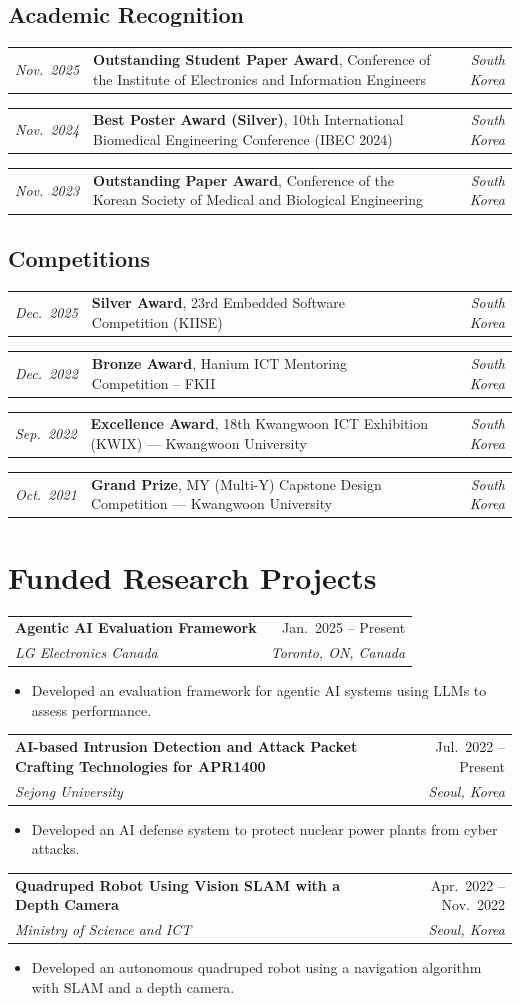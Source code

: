 \documentclass[11pt,letterpaper]{article}
\makeatletter
\newcommand{\entry}[4]{%
  \vspace{0.35em}\par
  \noindent\begin{tabularx}{\linewidth}{@{}X r@{}}
    \textbf{#1} & #2 \\[0.05em]
    \textit{#3} & \textit{#4}
  \end{tabularx}\par\vspace{0.1em}
}
\newcommand{\honor}[3]{%
  \noindent\begin{tabularx}{\linewidth}{@{}l X r@{}}
    \textit{\color{muted}#1} & #2 & \textit{\color{muted}#3}
  \end{tabularx}\par\vspace{0.1em}
}
\makeatother
\begin{document}
\subsection{Academic Recognition}
\honor{Nov.\ 2025}{\textbf{Outstanding Student Paper Award}, Conference of the Institute of Electronics and Information Engineers}{South Korea}
\honor{Nov.\ 2024}{\textbf{Best Poster Award (Silver)}, 10th International Biomedical Engineering Conference (IBEC 2024)}{South Korea}
\honor{Nov.\ 2023}{\textbf{Outstanding Paper Award}, Conference of the Korean Society of Medical and Biological Engineering}{South Korea}

\subsection{Competitions}
\honor{Dec.\ 2025}{\textbf{Silver Award}, 23rd Embedded Software Competition (KIISE)}{South Korea}
\honor{Dec.\ 2022}{\textbf{Bronze Award}, Hanium ICT Mentoring Competition -- FKII}{South Korea}
\honor{Sep.\ 2022}{\textbf{Excellence Award}, 18th Kwangwoon ICT Exhibition (KWIX) --- Kwangwoon University}{South Korea}
\honor{Oct.\ 2021}{\textbf{Grand Prize}, MY (Multi-Y) Capstone Design Competition --- Kwangwoon University}{South Korea}

\section{Funded Research Projects}

\entry{Agentic AI Evaluation Framework}{Jan.\ 2025 -- Present}{LG Electronics Canada}{Toronto, ON, Canada}
\begin{itemize}
  \item Developed an evaluation framework for agentic AI systems using LLMs to assess performance.
\end{itemize}

\entry{AI-based Intrusion Detection and Attack Packet Crafting Technologies for APR1400}{Jul.\ 2022 -- Present}{Sejong University}{Seoul, Korea}
\begin{itemize}
  \item Developed an AI defense system to protect nuclear power plants from cyber attacks.
\end{itemize}

\entry{Quadruped Robot Using Vision SLAM with a Depth Camera}{Apr.\ 2022 -- Nov.\ 2022}{Ministry of Science and ICT}{Seoul, Korea}
\begin{itemize}
  \item Developed an autonomous quadruped robot using a navigation algorithm with SLAM and a depth camera.
\end{itemize}
\end{document}
